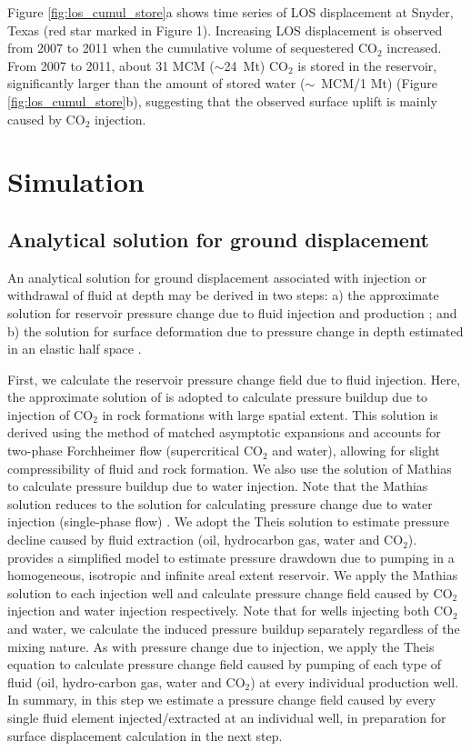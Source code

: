 Figure \ref{fig:los_cumul_store}a shows time series of LOS displacement at Snyder, Texas (red star marked in Figure 1).  Increasing LOS displacement is observed from 2007 to 2011 when the cumulative volume of sequestered CO$_{2}$ increased.  From 2007 to 2011, about 31 MCM ($\sim$24~Mt) CO$_{2}$ is stored in the reservoir, significantly larger than the amount of stored water ($\sim$~MCM/1 Mt) (Figure \ref{fig:los_cumul_store}b), suggesting that the observed surface uplift is mainly caused by CO$_{2}$ injection. 

\section{Simulation}
\subsection{Analytical solution for ground displacement}
An analytical solution for ground displacement associated with injection or withdrawal of fluid at depth may be derived in two steps: a) the approximate solution for reservoir pressure change due to fluid injection \cite[]{mathias2009approximate,mathias2009screening} and production \cite[]{theis1935relation}; and b) the solution for surface deformation due to pressure change in depth estimated in an elastic half space \cite[]{xu2012fluid}.

First, we calculate the reservoir pressure change field due to fluid injection.  Here, the approximate solution of \citet{mathias2009approximate} is adopted to calculate pressure buildup due to injection of CO$_{2}$ in rock formations with large spatial extent.  This solution is derived using the method of matched asymptotic expansions and accounts for two-phase Forchheimer flow (supercritical CO$_{2}$ and water), allowing for slight compressibility of fluid and rock formation.  We also use the solution of Mathias to calculate pressure buildup due to water injection.  Note that the Mathias solution reduces to the \citet{theis1935relation} solution for calculating pressure change due to water injection (single-phase flow) \cite[]{mathias2009approximate}.  We adopt the Theis solution to estimate pressure decline caused by fluid extraction (oil, hydrocarbon gas, water and CO$_{2}$).  \citet{theis1935relation} provides a simplified model to estimate pressure drawdown due to pumping in a homogeneous, isotropic and infinite areal extent reservoir.   We apply the Mathias solution to each injection well and calculate pressure change field caused by CO$_{2}$ injection and water injection respectively.  Note that for wells injecting both CO$_{2}$ and water, we calculate the induced pressure buildup separately regardless of the mixing nature.  As with pressure change due to injection, we apply the Theis equation to calculate pressure change field caused by pumping of each type of fluid (oil, hydro-carbon gas, water and CO$_{2}$) at every individual production well.  In summary, in this step we estimate a pressure change field caused by every single fluid element injected/extracted at an individual well, in preparation for surface displacement calculation in the next step. 

